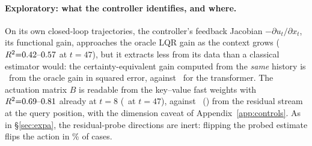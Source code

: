 \paragraph{Exploratory: what the controller identifies, and where.} On its own closed-loop trajectories, the
controller's feedback Jacobian $-\partial u_t/\partial x_t$, its functional gain, approaches the oracle LQR gain as the
context grows ($R^2{=}0.42\mbox{--}0.57$ at $t{=}47$), but it extracts less from its data than a classical estimator would:
the certainty-equivalent gain computed from the \emph{same} history is \CmechCEErrEnd\ from the oracle gain in squared
error, against \CmechGainErrEnd\ for the transformer. The actuation matrix $B$ is readable from the key--value fast
weights with $R^2{=}0.69\mbox{--}0.81$ already at $t{=}8$ (\CmechBfwEnd\ at $t{=}47$), against \CmechBresEarly\ (\CmechBresEnd)
from the residual stream at the query position, with the dimension caveat of Appendix~\ref{app:controls}. As in
\S\ref{sec:expa}, the residual-probe directions are inert: flipping the probed estimate flips the action in \Cflip\% of
cases.
